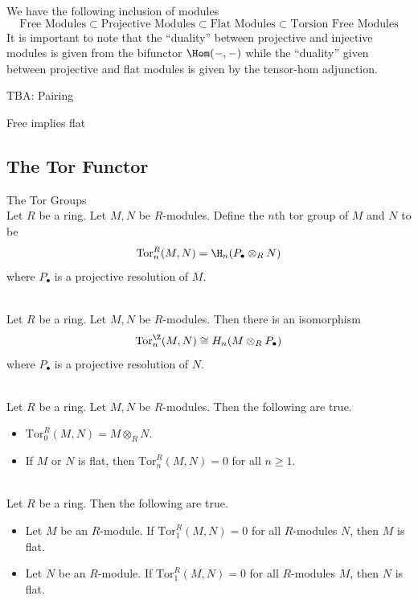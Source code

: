 \documentclass[a4paper]{article}
\begin{document}
We have the following inclusion of modules $$\text{Free Modules}\subset\text{Projective Modules}\subset\text{Flat Modules}\subset\text{Torsion Free Modules}$$ It is important to note that the ``duality'' between projective and injective modules is given from the bifunctor $\Hom(-,-)$ while the ``duality'' given between projective and flat modules is given by the tensor-hom adjunction. 

TBA: Pairing


Free implies flat

\subsection{The Tor Functor}
\begin{defn}{The Tor Groups}{}\\
Let $R$ be a ring. Let $M,N$ be $R$-modules. Define the $n$th tor group of $M$ and $N$ to be $$\text{Tor}_n^R(M,N)=\H_n(P_\bullet\otimes_RN)$$ where $P_\bullet$ is a projective resolution of $M$. 
\end{defn}

\begin{prp}{}{}\\
Let $R$ be a ring. Let $M,N$ be $R$-modules. Then there is an isomorphism $$\text{Tor}_n^\Z(M,N)\cong H_n(M\otimes_RP_\bullet)$$ where $P_\bullet$ is a projective resolution of $N$. 
\end{prp}

\begin{prp}{}{}\\
Let $R$ be a ring. Let $M,N$ be $R$-modules. Then the following are true. 
\begin{itemize}
\item $\text{Tor}_0^R(M,N)=M\otimes_RN$. 
\item If $M$ or $N$ is flat, then $\text{Tor}_n^R(M,N)=0$ for all $n\geq 1$. 
\end{itemize}
\end{prp}

\begin{prp}{}{}\\
Let $R$ be a ring. Then the following are true. 
\begin{itemize}
\item Let $M$ be an $R$-module. If $\text{Tor}_1^R(M,N)=0$ for all $R$-modules $N$, then $M$ is flat. 
\item Let $N$ be an $R$-module. If $\text{Tor}_1^R(M,N)=0$ for all $R$-modules $M$, then $N$ is flat. 
\end{itemize}
\end{prp}
\end{document}
